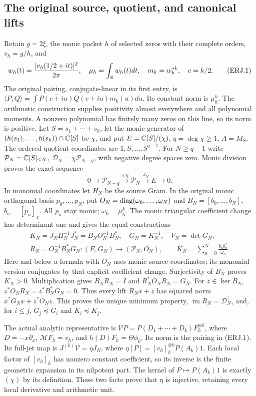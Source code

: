 \subsection{The original source, quotient, and canonical lifts}
Retain $g=2\xi$, the monic packet $h$ of selected zeros with their
complete orders, $v_h=g/h$, and
\[
 w_h(t)=\frac{|v_h(1/2+it)|^2}{2\pi},\quad
 \mu_h=\int_\mathbb R w_h(t)dt,\quad m_k=w_h^{*k},\quad c=k/2.
 \tag{ERJ.1}
\]
The original pairing, conjugate-linear in its first entry, is
$\langle P,Q\rangle=\int\overline{P(c+iu)}Q(c+iu)m_k(u)du$.
Its constant norm is $\mu_h^k$. The arithmetic construction supplies
positivity almost everywhere and all polynomial moments. A nonzero
polynomial has finitely many zeros on this line, so its norm is positive.
Let $S=s_1+\cdots+s_k$, let the monic generator of
$(h(s_1),\ldots,h(s_k))\cap\mathbb C[S]$ be $\chi$, and put
$E=\mathbb C[S]/(\chi)$, $q=\deg\chi\ge1$, $A=M_S$.
The ordered quotient coordinates are $1,S,\ldots,S^{q-1}$.
For $N\ge q-1$ write $\mathcal P_N=\mathbb C[S]_{\le N}$,
$\mathcal D_N=\chi\mathcal P_{N-q}$, with negative degree spaces zero.
Monic division proves the exact sequence
\[
0\longrightarrow\mathcal P_{N-q}\xrightarrow{\times\chi}
\mathcal P_N\xrightarrow{J_N}E\longrightarrow0.\tag{ERJ.2}
\]
In monomial coordinates let $H_N$ be the source Gram. In the original
monic orthogonal basis $p_0,\ldots,p_N$, put
$O_N=\operatorname{diag}(\omega_0,\ldots,\omega_N)$ and
$B_N=[b_0,\ldots,b_N]$, $b_n=[p_n]_\chi$. All $p_n$ stay monic;
$\omega_0=\mu_h^k$. The monic triangular coefficient change has
determinant one and gives the equal constructions
\[
\begin{gathered}
 K_N=J_NH_N^{-1}J_N^*=B_NO_N^{-1}B_N^*,\quad
 G_N=K_N^{-1},\quad V_N=\det G_N,\\
 R_N=O_N^{-1}B_N^*G_N:(E,G_N)\longrightarrow(\mathcal P_N,O_N),
 \qquad K_N=\sum_{n=0}^N\frac{b_nb_n^*}{\omega_n}.
\end{gathered}\tag{ERJ.3}
\]
Here and below a formula with $O_N$ uses monic source coordinates;
its monomial version conjugates by that explicit coefficient change.
Surjectivity of $B_N$ proves $K_N>0$. Multiplication gives
$B_NR_N=I$ and $R_N^*O_NR_N=G_N$. For $z\in\ker B_N$,
$z^*O_NR_N=z^*B_N^*G_N=0$. Thus every lift $R_Nx+z$ has
squared norm $x^*G_Nx+z^*O_Nz$. This proves the unique minimum property,
$\operatorname{im}R_N=\mathcal D_N^\perp$, and, for $i\le j$,
$G_j\preceq G_i$ and $K_i\preceq K_j$.

The actual analytic representative is
$\mathcal V P=P(D_1+\cdots+D_k)F_h^{\otimes k}$, where
$D=-x\partial_x$, $\mathcal MF_h=v_h$, and
$h(D)F_h=\Theta\phi_0$. Its norm is the pairing in (ERJ.1).
Its full-jet map is $J^{(k)}\mathcal V=\eta J_N$, where
$\eta[P]=[v_h]_h^{\otimes k}P(A_k)1$. Each local factor of
$[v_h]_h$ has nonzero constant coefficient, so its inverse is the
finite geometric expansion in its nilpotent part. The kernel of
$P\mapsto P(A_k)1$ is exactly $(\chi)$ by its definition.
These two facts prove that $\eta$ is injective, retaining every local
derivative and arithmetic unit.

